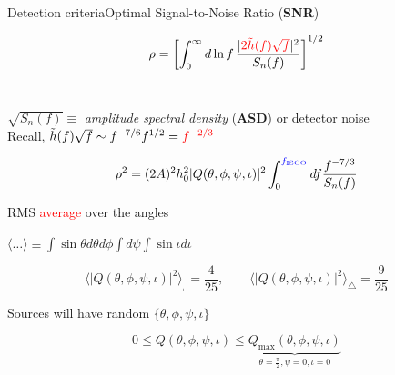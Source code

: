\documentclass[xcolor=dvipsnames,handout,t]{beamer}
\newcommand{\red}[1]{\textcolor{red}{#1}}
\newcommand{\bl}[1]{\textcolor{blue}{#1}}
\newcommand{\f}{\frac}
\begin{document}
\begin{frame}{Detection criteria}{Optimal Signal-to-Noise Ratio ({\bf SNR})}
\vspace{-5mm}
\begin{footnotesize} 
\[
 \rho=\left[ \int_0^\infty d\ln f\, \f{|\red{2\tilde{h}(f)\sqrt{f}}|^2}{S_n(f)}\right]^{1/2} 
\]
\\
\end{footnotesize}
$\sqrt{S_n(f)}\equiv$ {\it amplitude spectral density} ({\bf ASD}) or  detector noise
\\
\vspace{3mm}
Recall, $\tilde{h}(f) \sqrt{f} \sim f^{-7/6} f^{1/2} = \red{f^{-2/3}}$
\begin{footnotesize} 
\[
 \rho^2 =  (2A)^2 h_0^2 |Q(\theta,\phi,\psi,\iota)|^2 \int_0^{\bl{f_\text{ISCO}}} df \f{f^{-7/3}}{S_n(f)} 
\]
\end{footnotesize}
%
RMS \red{average} over the angles 
\begin{small}
$ \langle \ldots \rangle \equiv \int \sin\theta d\theta d\phi \int d\psi \int\sin\iota d\iota $
\end{small}
\begin{footnotesize} 
\[
 \langle |Q(\theta,\phi,\psi,\iota)|^2 \rangle_\llcorner = \f{4}{25}, \qquad \langle |Q(\theta,\phi,\psi,\iota)|^2 \rangle_\triangle = \f{9}{25}
\]
\end{footnotesize}
%
Sources will have random $\{\theta,\phi,\psi,\iota\}$ \\
\begin{footnotesize} 
\[
0 \le Q(\theta,\phi,\psi,\iota) \le \underbrace{Q_\text{max}(\theta,\phi,\psi,\iota)}_{\theta=\tfrac{\pi}{2},\psi=0,\iota=0}
\]
\end{footnotesize}
% 
\end{frame}
\end{document}
